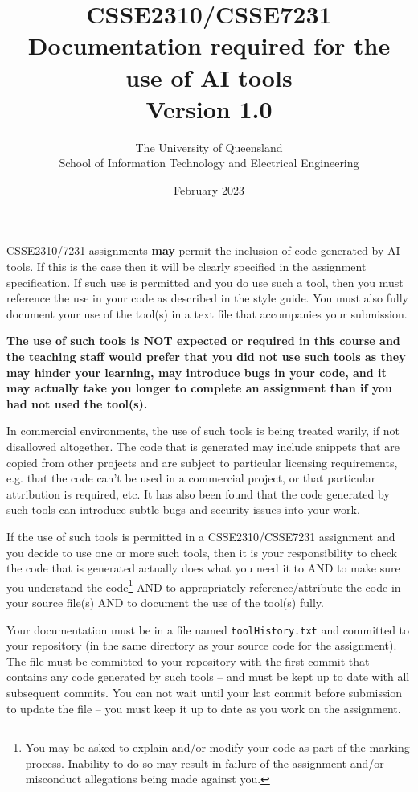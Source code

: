 \documentclass{article}
\title{CSSE2310/CSSE7231\\Documentation required for the use of AI tools\\Version 1.0}
\author{The University of Queensland\\School of Information Technology and Electrical Engineering}
\date{February 2023}
\begin{document}
\maketitle
\thispagestyle{plain}
\linenumbers

CSSE2310/7231 assignments \textbf{may} permit the inclusion of code generated by AI tools. If this is the case
then it will be clearly specified in the assignment specification. If such use is permitted and you do use such a tool, 
then you must reference the use in your code as described in the style guide. You must also fully document your use 
of the tool(s) in a text file that accompanies your submission.

\textbf{The use of such tools is NOT expected or required in this course and the teaching staff would prefer that you did
not use such tools as they may hinder your learning, may introduce bugs in your code, and it may actually take
you longer to complete an assignment than if you had not used the tool(s).}

In commercial environments, the use of such tools is being treated warily, if not disallowed altogether. The code that 
is generated may include snippets that are copied from other projects and are subject to particular licensing requirements, 
e.g. that the code can't be used in a commercial project, or that particular attribution is required, etc. It has also been found 
that the code generated by such tools can introduce subtle bugs and security issues into your work. 

If the use of such tools is permitted in a CSSE2310/CSSE7231 assignment and you decide to use one or more such tools, then it is your responsibility
to check the code that is generated actually does what you need it to AND to make sure you understand the code\footnote{You may be asked to explain and/or 
modify your code as part of the marking process. Inability to do so may result in failure of the assignment and/or misconduct 
allegations being made against you.} AND to appropriately reference/attribute the code in your source file(s) 
AND to document the use of the tool(s) fully.

Your documentation must be in a file named \texttt{toolHistory.txt} and committed to your repository (in the same directory as your 
source code for the assignment). The file must be committed to your repository with the first commit that contains any code generated
by such tools -- and must be kept up to date with all subsequent commits. You can not wait until your last commit before submission
to update the file -- you must keep it up to date as you work on the assignment.
\end{document}
